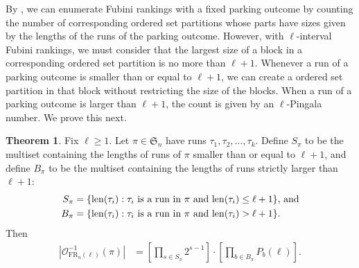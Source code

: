 \documentclass{amsart}
\theoremstyle{definition}
\newtheorem{theorem}{Theorem}[section]
\theoremstyle{definition}
\theoremstyle{remark}
\newcommand{\FR}[1]{\mathrm{FR}_{#1}}
\newcommand{\out}{\mathcal{O}}
\newcommand{\len}{\mathrm{len}}
\begin{document}
By , we can enumerate Fubini rankings with a fixed parking outcome by counting the number of corresponding ordered set partitions whose 
parts have sizes given by the lengths of the runs of the parking outcome. 
However, with $\ell$-interval Fubini rankings, 
we must consider that the largest size of a block in a corresponding ordered set partition is no more than $\ell+1$. 
Whenever a run of a parking outcome is smaller than or equal to $\ell+1$, we can create a ordered set partition in that block without restricting the size of the blocks. 
When a run of a parking outcome is larger than $\ell+1$, the count is given by an $\ell$-Pingala number.
We prove this next.

\begin{theorem}\label{thm:big theorem}
        Fix $\ell\geq 1$. Let $\pi\in \mathfrak{S}_n$ have runs $\tau_1,\tau_2,\ldots,\tau_k$.
        Define $S_{\pi}$ to be the multiset containing the lengths of runs of $\pi$ smaller than or equal to $\ell+1$, and define $B_{\pi}$ to be the multiset containing the lengths of runs strictly larger than $\ell+1$: 
        \begin{align}
            S_\pi&=\{\len(\tau_i):\text{$\tau_i$ is a run in $\pi$ and }\len(\tau_i)\leq \ell+1\}\text{, and}\notag \\
            B_\pi&=\{\len(\tau_i):\text{$\tau_i$ is a run in $\pi$ and }\len(\tau_i)>\ell+1\}\notag.
        \end{align}
    Then 
        \begin{align}
        \left|\out_{\FR{n}(\ell)}^{-1}(\pi)\right|&=\left[\prod_{s\in S_\pi}2^{s-1}\right]\cdot
        \left[\prod_{b\in B_\pi}P_{b}(\ell)\right].
    \end{align}
\end{theorem}
\end{document}
